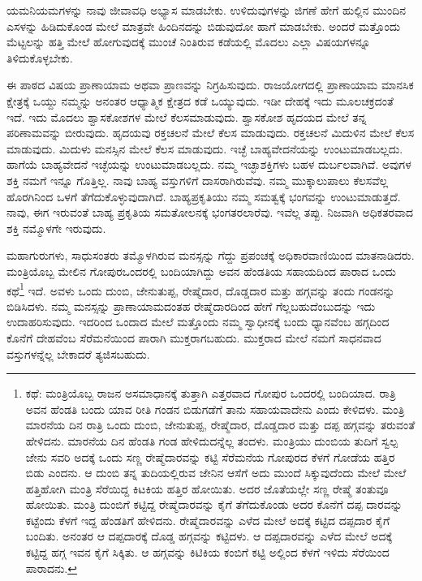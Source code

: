 ಯಮನಿಯಮಗಳನ್ನು ನಾವು ಜೀವಾವಧಿ ಅಭ್ಯಾಸ ಮಾಡಬೇಕು. ಉಳಿದುವುಗಳನ್ನು ಜಿಗಣೆ ಹೇಗೆ ಹುಲ್ಲಿನ ಮುಂದಿನ ಎಸಳನ್ನು ಹಿಡಿದುಕೊಂಡ ಮೇಲೆ ಮಾತ್ರವೇ ಹಿಂದಿನದನ್ನು ಬಿಡುವುದೋ ಹಾಗೆ ಮಾಡಬೇಕು. ಅಂದರೆ ಮತ್ತೊಂದು ಮೆಟ್ಟಲನ್ನು ಹತ್ತಿ ಮೇಲೆ ಹೋಗುವುದಕ್ಕೆ ಮುಂಚೆ ನಿಂತಿರುವ ಕಡೆಯಲ್ಲಿ ಮೊದಲು ಎಲ್ಲಾ ವಿಷಯಗಳನ್ನೂ ತಿಳಿದುಕೊಳ್ಳಬೇಕು.

ಈ ಪಾಠದ ವಿಷಯ ಪ್ರಾಣಾಯಾಮ ಅಥವಾ ಪ್ರಾಣವನ್ನು ನಿಗ್ರಹಿಸುವುದು. ರಾಜಯೋಗದಲ್ಲಿ ಪ್ರಾಣಾಯಾಮ ಮಾನಸಿಕ ಕ್ಷೇತ್ರಕ್ಕೆ ಒಯ್ದು ನಮ್ಮನ್ನು ಅನಂತರ ಆಧ್ಯಾತ್ಮಿಕ ಕ್ಷೇತ್ರದ ಕಡೆ ಒಯ್ಯುವುದು. ಇಡೀ ದೇಹಕ್ಕೆ ಇದು ಮೂಲಚಕ್ರದಂತೆ ಇದೆ. ಇದು ಮೊದಲು ಶ್ವಾಸಕೋಶಗಳ ಮೇಲೆ ಕೆಲಸಮಾಡುವುದು. ಶ್ವಾಸಕೋಶ ಹೃದಯದ ಮೇಲೆ ತನ್ನ ಪರಿಣಾಮವನ್ನು ಬೀರುವುದು. ಹೃದಯವು ರಕ್ತಚಲನೆ ಮೇಲೆ ಕೆಲಸ ಮಾಡುವುದು. ರಕ್ತಚಲನೆ ಮಿದುಳಿನ ಮೇಲೆ ಕೆಲಸ ಮಾಡುವುದು. ಮಿದುಳು ಮನಸ್ಸಿನ ಮೇಲೆ ಕೆಲಸ ಮಾಡುವುದು. ಇಚ್ಛೆ ಬಾಹ್ಯವೇದನೆಯನ್ನು ಉಂಟುಮಾಡಬಲ್ಲದು. ಹಾಗೆಯೆ ಬಾಹ್ಯವೇದನೆ ಇಚ್ಛೆಯನ್ನು ಉಂಟುಮಾಡಬಲ್ಲದು. ನಮ್ಮ ಇಚ್ಛಾಶಕ್ತಿಗಳು ಬಹಳ ದುರ್ಬಲವಾಗಿವೆ. ಅವುಗಳ ಶಕ್ತಿ ನಮಗೆ ಇನ್ನೂ ಗೊತ್ತಿಲ್ಲ. ನಾವು ಬಾಹ್ಯ ವಸ್ತುಗಳಿಗೆ ದಾಸರಾಗಿರುವೆವು. ನಮ್ಮ ಮುಕ್ಕಾಲುಪಾಲು ಕೆಲಸವೆಲ್ಲ ಹೊರಗಿನಿಂದ ಒಳಗೆ ತೆಗೆದುಕೊಳ್ಳುವುದಾಗಿದೆ. ಬಾಹ್ಯಪ್ರಕೃತಿಯು ನಮ್ಮ ಸಮತ್ವಕ್ಕೆ ಭಂಗವನ್ನು ಉಂಟುಮಾಡುತ್ತದೆ. ನಾವು, ಈಗ ಇರುವಂತೆ ಬಾಹ್ಯ ಪ್ರಕೃತಿಯ ಸಮತೋಲನಕ್ಕೆ ಭಂಗತರಲಾರೆವು. ಇವೆಲ್ಲ ತಪ್ಪು. ನಿಜವಾಗಿ ಅಧಿಕತರವಾದ ಶಕ್ತಿ ನಮ್ಮೊಳಗೇ ಇರುವುದು.

ಮಹಾಗುರುಗಳು, ಸಾಧುಸಂತರು ತಮ್ಮೊಳಗಿರುವ ಮನಸ್ಸನ್ನು ಗೆದ್ದು ಪ್ರಪಂಚಕ್ಕೆ ಅಧಿಕಾರವಾಣಿಯಿಂದ ಮಾತನಾಡಿದರು. ಮಂತ್ರಿಯೊಬ್ಬ ಮೇಲಿನ ಗೋಪುರ\break ಒಂದರಲ್ಲಿ ಬಂದಿಯಾಗಿದ್ದು ಅವನ ಹೆಂಡತಿಯ ಸಹಾಯದಿಂದ ಪಾರಾದ ಒಂದು ಕಥೆ\footnote{ಕಥೆ: ಮಂತ್ರಿಯೊಬ್ಬ ರಾಜನ ಅಸಮಾಧಾನಕ್ಕೆ ತುತ್ತಾಗಿ ಎತ್ತರವಾದ ಗೋಪುರ ಒಂದರಲ್ಲಿ ಬಂದಿಯಾದ. ರಾತ್ರಿ ಅವನ ಹೆಂಡತಿ ಬಂದು ಯಾವ ರೀತಿ ಗಂಡನ ಬಿಡುಗಡೆಗೆ ತಾನು ಸಹಾಯವಾದೇನು ಎಂದು ಕೇಳಿದಳು. ಮಂತ್ರಿ ಮಾರನೆಯ ದಿನ ರಾತ್ರಿ ಒಂದು ದುಂಬಿ, ಜೇನುತುಪ್ಪ, ರೇಷ್ಮೆದಾರ, ದೊಡ್ಡದಾರ ಮತ್ತು ದಪ್ಪ ಹಗ್ಗವನ್ನು ತರುವಂತೆ ಹೇಳಿದನು. ಮಾರನೆಯ ದಿನ ಹೆಂಡತಿ ಗಂಡ ಹೇಳಿದುದನ್ನೆಲ್ಲ ತಂದಳು. ಮಂತ್ರಿಯು ದುಂಬಿಯ ತುದಿಗೆ ಸ್ವಲ್ಪ ಜೇನು ಸವರಿ ಅದಕ್ಕೆ ಒಂದು ಸಣ್ಣ ರೇಷ್ಮೆದಾರವನ್ನು ಕಟ್ಟಿ ಸೆರೆಮನೆಯ ಗೋಪುರದ ಕೆಳಗೆ ಗೋಡೆಯ ಹತ್ತಿರ ಬಿಡು ಎಂದನು. ಆ ದುಂಬಿ ತನ್ನ ತುದಿಯಲ್ಲಿರುವ ಜೇನಿನ ಆಸೆಗೆ ಅದು ಮುಂದೆ ಸಿಕ್ಕುವುದೆಂದು ಮೇಲೆ ಮೇಲೆ ಹತ್ತಿಹೋಗಿ ಮಂತ್ರಿ ಸೆರೆಯಿದ್ದ ಕಿಟಕಿಯ ಹತ್ತಿರ ಹೋಯಿತು. ಅದರ ಜೊತೆಯಲ್ಲೇ ಸಣ್ಣ ರೇಷ್ಮೆ ತಂತುವೂ ಹೋಯಿತು. ಮಂತ್ರಿ ದುಂಬಿಗೆ ಕಟ್ಟಿದ್ದ ರೇಷ್ಮೆದಾರವನ್ನು ಕೈಗೆ ತೆಗೆದುಕೊಂಡು ಅದರ ಕೊನೆಗೆ ದಪ್ಪ ದಾರವನ್ನು ಕಟ್ಟೆಂದು ಕೆಳಗೆ ಇದ್ದ ಹೆಂಡತಿಗೆ ಹೇಳಿದನು. ರೇಷ್ಮೆದಾರವನ್ನು ಎಳೆದ ಮೇಲೆ ಅದಕ್ಕೆ ಕಟ್ಟಿದ ದಪ್ಪದಾರ ಕೈಗೆ ಬಂದಿತು. ಅನಂತರ ಆ ದಪ್ಪದಾರಕ್ಕೆ ದೊಡ್ಡ ಹಗ್ಗವನ್ನು ಕಟ್ಟಿದಳು. ಆ ದಪ್ಪದಾರವನ್ನು ಎಳೆದ ಮೇಲೆ ಅದಕ್ಕೆ ಕಟ್ಟಿದ್ದ ಹಗ್ಗ ಇವನ ಕೈಗೆ ಸಿಕ್ಕಿತು. ಆ ಹಗ್ಗವನ್ನು ಕಿಟಿಕಿಯ ಕಂಬಿಗೆ ಕಟ್ಟಿ ಅಲ್ಲಿಂದ ಕೆಳಗೆ ಇಳಿದು ಸೆರೆಯಿಂದ ಪಾರಾದನು.} ಇದೆ. ಅವಳು ಒಂದು ದುಂಬಿ, ಜೇನುತುಪ್ಪ, ರೇಷ್ಮೆದಾರ, ದೊಡ್ಡದಾರ ಮತ್ತು ಹಗ್ಗವನ್ನು ತಂದು ಗಂಡನನ್ನು ಬಿಡಿಸಿದಳು. ನಮ್ಮ ಮನಸ್ಸನ್ನು ಪ್ರಾಣಾಯಾಮದಂತಹ ರೇಷ್ಮೆದಾರದಿಂದ ಹೇಗೆ ಗೆಲ್ಲಬಹುದೆಂಬುದನ್ನು ಇದು ಉದಾಹರಿಸುವುದು. ಇದರಿಂದ ಒಂದಾದ ಮೇಲೆ ಮತ್ತೊಂದು ನಮ್ಮ ಸ್ವಾಧೀನಕ್ಕೆ ಬಂದು ಧ್ಯಾನವೆಂಬ ಹಗ್ಗದಿಂದ ಕೊನೆಗೆ ದೇಹವೆಂಬ ಸೆರೆಮನೆಯಿಂದ ಪಾರಾಗಿ ಮುಕ್ತರಾಗಬಹುದು. ಮುಕ್ತರಾದ ಮೇಲೆ ನಮಗೆ ಸಾಧನವಾದ ವಸ್ತುಗಳನ್ನೆಲ್ಲ ಬೇಕಾದರೆ ತ್ಯಜಿಸಬಹುದು.

